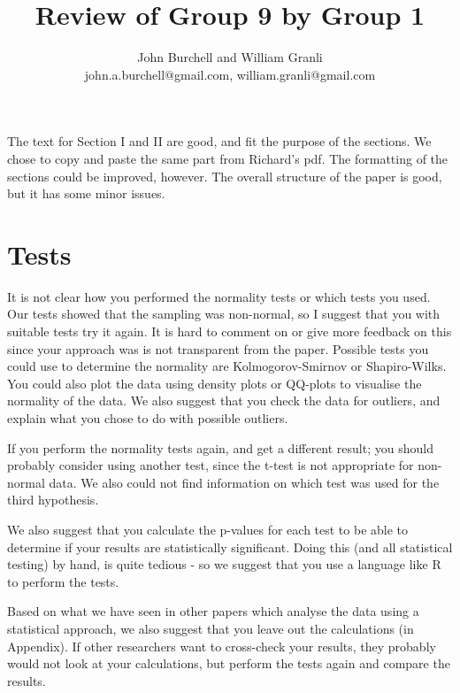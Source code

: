 \documentclass[times, 10pt,twocolumn]{article}
\begin{document}
\title{Review of Group 9 by Group 1}

\author{John Burchell and William Granli \\
john.a.burchell@gmail.com, william.granli@gmail.com}



\maketitle
\thispagestyle{empty}




The text for Section I and II are good, and fit the purpose of the sections. We chose to copy and paste the same part from Richard's pdf. The formatting of the sections could be improved, however. The overall structure of the paper is good, but it has some minor issues. 

\section{Tests}
It is not clear how you performed the normality tests or which tests you used. Our tests showed that the sampling was non-normal, so I suggest that you with suitable tests try it again. It is hard to comment on or give more feedback on this since your approach was is not transparent from the paper. Possible tests you could use to determine the normality are Kolmogorov-Smirnov or Shapiro-Wilks. You could also plot the data using density plots or QQ-plots to visualise the normality of the data. We also suggest that you check the data for outliers, and explain what you chose to do with possible outliers. 

If you perform the normality tests again, and get a different result; you should probably consider using another test, since the t-test is not appropriate for non-normal data. We also could not find information on which test was used for the third hypothesis. 

We also suggest that you calculate the p-values for each test to be able to determine if your results are statistically significant. Doing this (and all statistical testing) by hand, is quite tedious - so we suggest that you use a language like R to perform the tests. 

Based on what we have seen in other papers which analyse the data using a statistical approach, we also suggest that you leave out the calculations (in Appendix). If other researchers want to cross-check your results, they probably would not look at your calculations, but perform the tests again and compare the results. 
\end{document}
